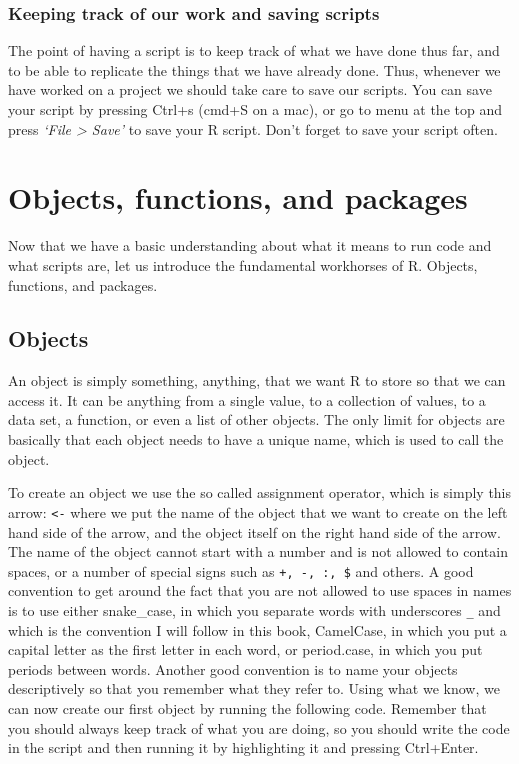 \documentclass[
]{book}
\begin{document}
\hypertarget{keeping-track-of-our-work-and-saving-scripts}{%
\subsection{Keeping track of our work and saving scripts}\label{keeping-track-of-our-work-and-saving-scripts}}

The point of having a script is to keep track of what we have done thus far, and to be able to replicate the things that we have already done. Thus, whenever we have worked on a project we should take care to save our scripts. You can save your script by pressing Ctrl+s (cmd+S on a mac), or go to menu at the top and press \emph{`File \textgreater{} Save'} to save your R script. Don't forget to save your script often.

\hypertarget{objects-functions-and-packages}{%
\chapter{Objects, functions, and packages}\label{objects-functions-and-packages}}

Now that we have a basic understanding about what it means to run code and what scripts are, let us introduce the fundamental workhorses of R. Objects, functions, and packages.

\hypertarget{objects}{%
\section{Objects}\label{objects}}

An object is simply something, anything, that we want R to store so that we can access it. It can be anything from a single value, to a collection of values, to a data set, a function, or even a list of other objects. The only limit for objects are basically that each object needs to have a unique name, which is used to call the object.

To create an object we use the so called assignment operator, which is simply this arrow: \texttt{\textless{}-} where we put the name of the object that we want to create on the left hand side of the arrow, and the object itself on the right hand side of the arrow. The name of the object cannot start with a number and is not allowed to contain spaces, or a number of special signs such as \texttt{+,\ -,\ :,\ \$} and others. A good convention to get around the fact that you are not allowed to use spaces in names is to use either snake\_case, in which you separate words with underscores \texttt{\_} and which is the convention I will follow in this book, CamelCase, in which you put a capital letter as the first letter in each word, or period.case, in which you put periods between words. Another good convention is to name your objects descriptively so that you remember what they refer to. Using what we know, we can now create our first object by running the following code. Remember that you should always keep track of what you are doing, so you should write the code in the script and then running it by highlighting it and pressing Ctrl+Enter.
\end{document}
